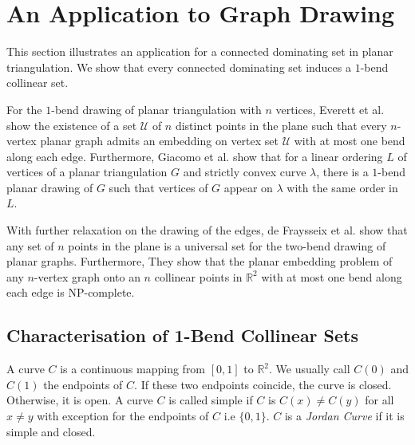 \section{An Application to Graph Drawing}
\label{one_bend}
This section illustrates an application for a connected dominating set in planar triangulation. We show that every connected dominating set induces a $1$-bend collinear set. 



For the $1$-bend drawing of planar triangulation with $n$ vertices,  Everett et al. \cite{DBLP:conf/gd/EverettLLW07} show the existence of a set $\mathcal{U}$ of $n$ distinct points in the plane such that every $n$-vertex planar graph admits an embedding on vertex set $\mathcal{U}$ with at most one bend along each edge. Furthermore, Giacomo et al. \cite{DBLP:journals/comgeo/GiacomoDLW05} show that for a linear ordering $L$ of vertices of a planar triangulation $G$ and strictly convex curve $\lambda$, there is a $1$-bend planar drawing of $G$ such that vertices of $G$ appear on $\lambda$ with the same order in $L$.

With further relaxation on the drawing of the edges, de Fraysseix et al. \cite{DBLP:journals/combinatorica/FraysseixPP90} show that any set of $n$ points in the plane is a universal set for the two-bend drawing of planar graphs. Furthermore, They show that the planar embedding problem of any $n$-vertex graph onto an $n$ collinear points in $\mathbb{R}^2$ with at most one bend along each edge is NP-complete.

\subsection{Characterisation of 1-Bend Collinear Sets}
A curve $C$ is a continuous mapping from $[0, 1]$ to $\mathbb{R}^2$. We usually call $C(0)$ and $C(1)$ the endpoints of $C$. If these two endpoints coincide, the curve is closed. Otherwise, it is open. A curve $C$ is called simple if $C$ is $C(x) \neq C(y)$ for all $x \neq y$ with exception for the endpoints of $C$ i.e $\{0, 1\}$. $C$ is a \textit{Jordan Curve} if it is simple and closed.

